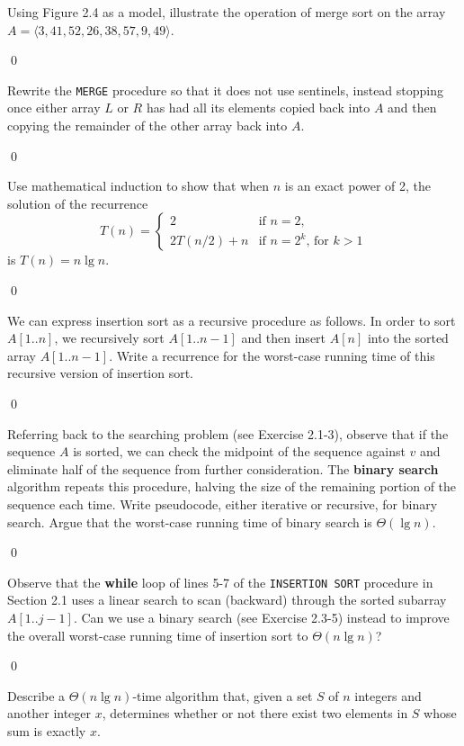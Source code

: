  Using Figure 2.4 as a model, illustrate the operation of merge sort on the array $A = \langle 3, 41, 52, 26, 38, 57, 9, 49 \rangle$.

\sol \qed

 Rewrite the \verb|MERGE| procedure so that it does not use sentinels, instead stopping once either array $L$ or $R$ has had all its elements copied back into $A$ and then copying the remainder of the other array back into $A$.

\sol \qed

 Use mathematical induction to show that when $n$ is an exact power of 2, the solution of the recurrence $$T(n) = \begin{cases} 2 & \text{if } n = 2, \\ 2T(n/2) + n & \text{if } n = 2^k \text{, for } k > 1 \end{cases}$$ is $T(n) = n \lg n$.

\sol \qed

 We can express insertion sort as a recursive procedure as follows. In order to sort $A[1..n]$, we recursively sort $A[1..n-1]$ and then insert $A[n]$ into the sorted array $A[1..n-1]$. Write a recurrence for the worst-case running time of this recursive version of insertion sort.

\sol \qed

 Referring back to the searching problem (see Exercise 2.1-3), observe that if the sequence $A$ is sorted, we can check the midpoint of the sequence against $v$ and eliminate half of the sequence from further consideration. The \textbf{binary search} algorithm repeats this procedure, halving the size of the remaining portion of the sequence each time. Write pseudocode, either iterative or recursive, for binary search. Argue that the worst-case running time of binary search is $\Theta(\lg n)$.

\sol \qed

 Observe that the \textbf{while} loop of lines 5-7 of the \verb|INSERTION SORT| procedure in Section 2.1 uses a linear search to scan (backward) through the sorted subarray $A[1..j-1]$. Can we use a binary search (see Exercise 2.3-5) instead to improve the overall worst-case running time of insertion sort to $\Theta(n \lg n)$?

\sol \qed

 Describe a $\Theta(n \lg n)$-time algorithm that, given a set $S$ of $n$ integers and another integer $x$, determines whether or not there exist two elements in $S$ whose sum is exactly $x$.

